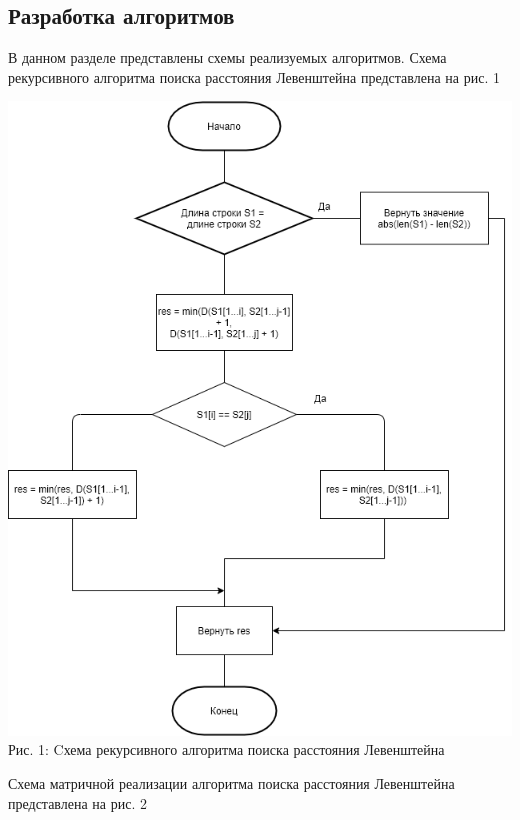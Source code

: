 \documentclass[12pt,a4paper]{article}
\begin{document}
\subsection{Разработка алгоритмов} %
В данном разделе представлены схемы реализуемых алгоритмов.
Схема рекурсивного алгоритма поиска расстояния Левенштейна представлена на рис. 1
\begin{center}	
	
	\includegraphics[width=0.9\linewidth]{lev_rec}\\
	\label{formula1} Рис. 1: Cхема рекурсивного алгоритма поиска расстояния Левенштейна
\end{center}
\clearpage
Схема матричной реализации алгоритма поиска расстояния Левенштейна представлена на рис. 2
\end{document}
